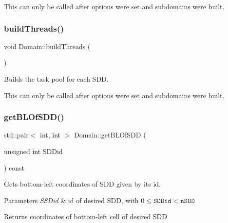 This can only be called after options were set and subdomains were built. \mbox{\label{classDomain_aa2e6cebf44a57323f3c6344d131126c1}} 
\subsubsection{\texorpdfstring{build\+Threads()}{buildThreads()}\hspace{0.1cm}{\footnotesize\ttfamily [2/2]}}
{\footnotesize\ttfamily void Domain\+::build\+Threads (\begin{DoxyParamCaption}{ }\end{DoxyParamCaption})}



Builds the task pool for each S\+DD. 

This can only be called after options were set and subdomains were built. \mbox{\label{classDomain_a29e2005bed3aa17f036b8d2b36084153}} 
\subsubsection{\texorpdfstring{get\+B\+L\+Of\+S\+D\+D()}{getBLOfSDD()}\hspace{0.1cm}{\footnotesize\ttfamily [1/2]}}
{\footnotesize\ttfamily std\+::pair$<$ int, int $>$ Domain\+::get\+B\+L\+Of\+S\+DD (\begin{DoxyParamCaption}\item[{unsigned int}]{S\+D\+Did }\end{DoxyParamCaption}) const}



Gets bottom-\/left coordinates of S\+DD given by its id. 


\begin{DoxyParams}{Parameters}
{\em S\+S\+Did} & id of desired S\+DD, with $0 \leq \texttt{SDDid} < \texttt{nSDD}$\\
\hline
\end{DoxyParams}
\begin{DoxyReturn}{Returns}
coordinates of bottom-\/left cell of desired S\+DD 
\end{DoxyReturn}
\mbox{\label{classDomain_a9dd93464e05e2a631f01cc30277db885}} 
